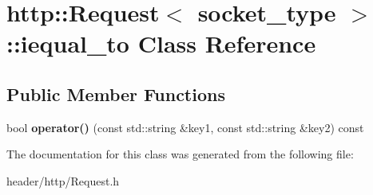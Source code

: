\hypertarget{classhttp_1_1_request_1_1iequal__to}{}\section{http\+:\+:Request$<$ socket\+\_\+type $>$\+:\+:iequal\+\_\+to Class Reference}
\label{classhttp_1_1_request_1_1iequal__to}
\subsection*{Public Member Functions}
\begin{DoxyCompactItemize}
\item 
\mbox{\label{classhttp_1_1_request_1_1iequal__to_a7263f46c51160bf8fc54327c14a9c108}} 
bool {\bfseries operator()} (const std\+::string \&key1, const std\+::string \&key2) const
\end{DoxyCompactItemize}


The documentation for this class was generated from the following file\+:\begin{DoxyCompactItemize}
\item 
header/http/Request.\+h\end{DoxyCompactItemize}
